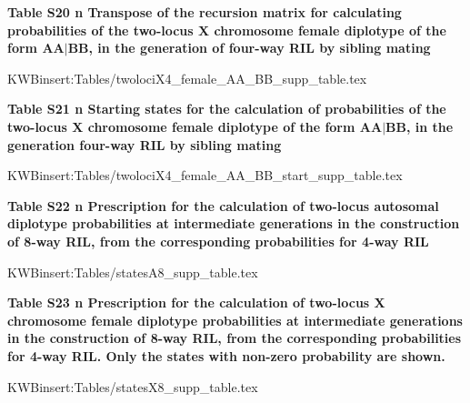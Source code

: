 \documentclass[9pt,letterpaper,twoside]{article}
\begin{document}
\noindent \textbf{Table S20 {\color{white} n} Transpose of the recursion matrix for
calculating probabilities of the two-locus X chromosome female diplotype of the form $\boldsymbol{AA|BB}$,
in the generation of four-way RIL by sibling mating}

\bigskip

{
KWBinsert:Tables/twolociX4_female_AA_BB_supp_table.tex
}

\newpage

\noindent \textbf{Table S21 {\color{white} n} Starting states for the calculation of
probabilities of the two-locus X chromosome female diplotype of the form $\boldsymbol{AA|BB}$,
in the generation four-way RIL by sibling mating}

\bigskip

{
KWBinsert:Tables/twolociX4_female_AA_BB_start_supp_table.tex
}

\newpage

\noindent \textbf{Table S22 {\color{white} n} Prescription for the calculation of two-locus
autosomal diplotype probabilities at intermediate generations in the
construction of 8-way RIL, from the corresponding probabilities for
4-way RIL}

\bigskip

{
KWBinsert:Tables/statesA8_supp_table.tex
}
\newpage

\noindent \textbf{Table S23 {\color{white} n} Prescription for the calculation of two-locus X
chromosome female diplotype probabilities at intermediate generations
in the construction of 8-way RIL, from the corresponding probabilities
for 4-way RIL. Only the states with non-zero probability are shown.}

\bigskip

{
KWBinsert:Tables/statesX8_supp_table.tex
}
\end{document}
